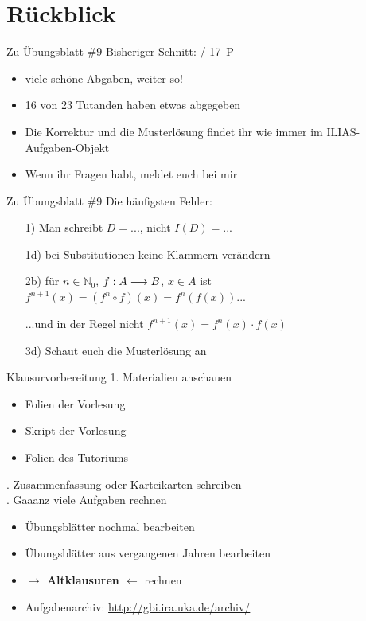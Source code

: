 
\newcommand{\handout}{}



\morescalingdelimiters



\section{Rückblick}
\begin{frame}{Zu Übungsblatt \#9}
	Bisheriger Schnitt:  / 17~P

	\begin{itemize}
		\item viele schöne Abgaben, weiter so!
		\item 16 von 23 Tutanden haben etwas abgegeben
		\item Die Korrektur und die Musterlösung findet ihr wie immer im ILIAS-Aufgaben-Objekt
		\item Wenn ihr Fragen habt, meldet euch bei mir
	\end{itemize}
\end{frame}

\begin{frame}{Zu Übungsblatt \#9}
	Die häufigsten Fehler:
	\begin{itemize}[<+->]
		\item[1)] Man schreibt $D=...$, nicht $I(D)=...$
		\item[1d)] bei Substitutionen keine Klammern verändern
		\item[2b)] für $n \in \mathbb{N}_0$, $f : A \longrightarrow B$, $x \in A$ ist $f^{n+1}(x)=(f^n \circ f)(x) = f^n(f(x))$...
		\item[] ...und in der Regel nicht $f^{n+1}(x)=f^n(x)\cdot f(x)$
		\item[3d)] Schaut euch die Musterlösung an
	\end{itemize}
\end{frame}

\begin{frame}{Klausurvorbereitung}
	1. Materialien anschauen
	\begin{itemize}
		\item Folien der Vorlesung
		\item Skript der Vorlesung
		\item Folien des Tutoriums
	\end{itemize}

	. Zusammenfassung oder Karteikarten schreiben \\

	. Gaaanz viele Aufgaben rechnen
	\begin{itemize}
		\item Übungsblätter nochmal bearbeiten
		\item Übungsblätter aus vergangenen Jahren bearbeiten
		\item \textbf{$\rightarrow$ Altklausuren $\leftarrow$} rechnen
		\item Aufgabenarchiv: \url{http://gbi.ira.uka.de/archiv/}
	\end{itemize}
\end{frame}


